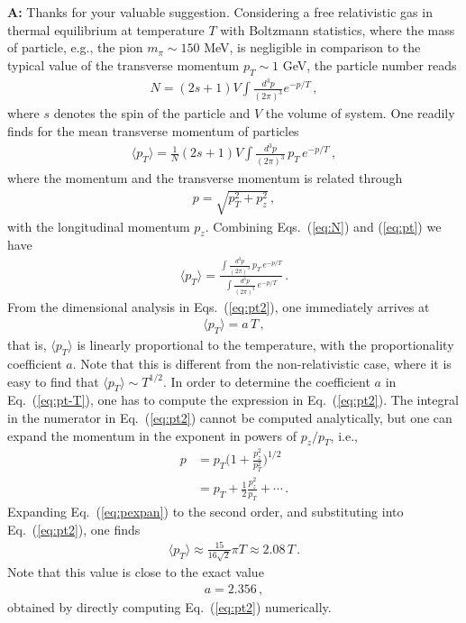 \documentclass[aps,article,author-year,notitlepage,showpacs]{revtex4-2}
\begin{document}
\begin{itemize}
{\bf A:} Thanks for your valuable suggestion. Considering a free relativistic gas in thermal equilibrium at temperature $T$ with Boltzmann statistics, where the mass of particle, e.g., the pion $m_\pi\sim 150 $ MeV, is negligible in comparison to the typical value of the transverse momentum $p_T \sim 1$ GeV, the particle number reads
\begin{align}
    N=(2s+1)V\int \frac{d^3 p}{(2\pi)^3}e^{-p/T}\,, \label{eq:N}
\end{align}
where $s$ denotes the spin of the particle and $V$ the volume of system. One readily finds for the mean transverse momentum of particles
\begin{align}
    \langle p_{T} \rangle=\frac{1}{N}(2s+1)V\int \frac{d^3 p}{(2\pi)^3}\,p_{T}\,e^{-p/T}\,, \label{eq:pt}
\end{align}
where the momentum and the transverse momentum is related through
\begin{align}
    p=\sqrt{p_{T}^2+p_z^2}\,, \label{}
\end{align}
with the longitudinal momentum $p_z$. Combining Eqs.~(\ref{eq:N}) and (\ref{eq:pt}) we have
\begin{align}
    \langle p_{T} \rangle=\frac{\int \frac{d^3 p}{(2\pi)^3}\,p_{T}\,e^{-p/T}}{\int \frac{d^3 p}{(2\pi)^3}\,e^{-p/T}}\,. \label{eq:pt2}
\end{align}
From the dimensional analysis in Eqs.~(\ref{eq:pt2}), one immediately arrives at
\begin{align}
    \langle p_{T} \rangle=a\, T\,, \label{eq:pt-T}
\end{align}
that is, $\langle p_{T} \rangle$ is linearly proportional to the temperature, with the proportionality coefficient $a$. Note that this is different from the non-relativistic case, where it is easy to find that $\langle p_{T} \rangle \sim T^{1/2}$. In order to determine the coefficient $a$ in Eq.~(\ref{eq:pt-T}), one has to compute the expression in Eq.~(\ref{eq:pt2}). The integral in the numerator in Eq.~(\ref{eq:pt2}) cannot be computed analytically, but one can expand the momentum in the exponent in powers of $p_z/p_{T}$, i.e.,
\begin{align}
    p&=p_{T}\Big(1+\frac{p_z^2}{p_{T}^2}\Big)^{1/2} \nonumber\\[2ex]
    &=p_{T}+\frac{1}{2}\frac{p_z^2}{p_{T}}+\cdots\,.\label{eq:pexpan}
\end{align}
Expanding Eq.~(\ref{eq:pexpan}) to the second order, and substituting into Eq.~(\ref{eq:pt2}), one finds
\begin{align}
    \langle p_{T} \rangle \approx \frac{15}{16\sqrt{2}}\pi T \approx 2.08 \,T\,. \label{}
\end{align}
Note that this value is close to the exact value
\begin{align}
    a=2.356\,, \label{}
\end{align}
obtained by directly computing Eq.~(\ref{eq:pt2}) numerically.\\


\end{itemize}
\end{document}
